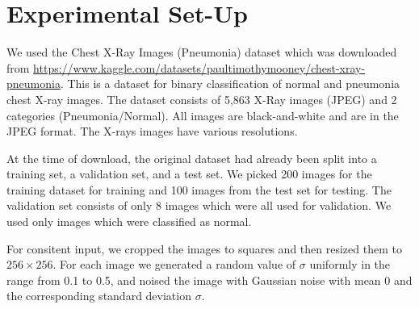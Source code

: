 \documentclass[12pt]{article}
\begin{document}
\section{Experimental Set-Up}



We used the Chest X-Ray Images (Pneumonia) dataset which was downloaded from \url{https://www.kaggle.com/datasets/paultimothymooney/chest-xray-pneumonia}. 
This is a dataset for binary classification of normal and pneumonia chest X-ray images. 
The dataset consists of 5,863 X-Ray images (JPEG) and 2 categories (Pneumonia/Normal).
All images are black-and-white and are in the JPEG format.
The X-rays images have various resolutions.

At the time of download, the original dataset had already been split into a training set, a validation set, and a test set.
We picked 200 images for the training dataset for training and 100 images from the test set for testing. The validation set consists of only 8 images which were all used for validation.
We used only images which were classified as normal.

For consitent input, we cropped the images to squares and then resized them to $256 \times 256$.
For each image we generated a random value of $\sigma$ uniformly in the range from 0.1 to 0.5, and noised the image with Gaussian noise with mean 0 and the corresponding standard deviation $\sigma$.


\end{document}
